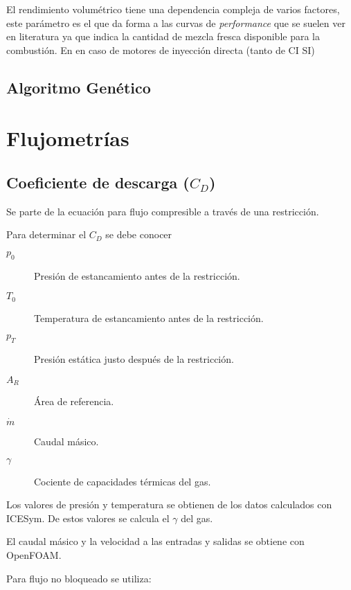 El rendimiento volumétrico tiene una dependencia compleja de varios factores,
este parámetro es el que da forma a las curvas de \emph{performance} que se
suelen ver en literatura ya que indica la cantidad de mezcla fresca disponible
para la combustión. En en caso de motores de inyección directa (tanto de CI SI)

\subsection{Algoritmo Genético}

\section{Flujometrías}
\subsection{}
\subsection{Coeficiente de descarga ($C_D$)}

Se parte de la ecuación para flujo compresible a través de una restricción.

Para determinar el $C_D$ se debe conocer

\begin{description}
    \item[$p_0$] Presión de estancamiento antes de la restricción.
    \item[$T_0$] Temperatura de estancamiento antes de la restricción.
    \item[$p_T$] Presión estática justo después de la restricción.
    \item[$A_R$] Área de referencia.
    \item[$\dot{m}$] Caudal másico.
    \item[$\gamma$] Cociente de capacidades térmicas del gas.
\end{description}

Los valores de presión y temperatura se obtienen de los datos calculados con
ICESym. De estos valores se calcula el $\gamma$ del gas.

El caudal másico y la velocidad a las entradas y salidas se obtiene con
OpenFOAM.

Para flujo no bloqueado se utiliza:

